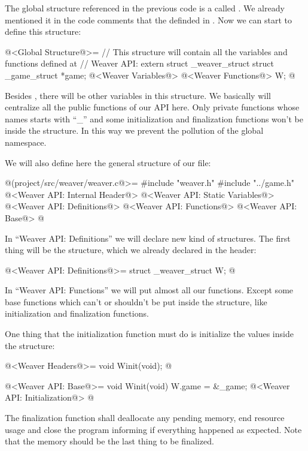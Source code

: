 The global structure referenced in the previous code is a
 called . We already mentioned it
in the code comments that the
 definded in
. Now we can start to define this structure:

\iniciocodigo
@<Global Structure@>=
// This structure will contain all the variables and functions defined at
// Weaver API:
extern struct _weaver_struct{
  struct _game_struct *game;
  @<Weaver Variables@>
  @<Weaver Functions@>
} W;
@
\fimcodigo

Besides , there will be other variables in this
structure. We basically will centralize all the public functions of
our API here. Only private functions whose names starts with ``\_''
and some initialization and finalization functions won't be inside
the  structure. In this way we prevent the pollution of
the global namespace.

We will also define here the general structure of
our  file:

\iniciocodigo
@(project/src/weaver/weaver.c@>=
#include "weaver.h"
#include "../game.h"
@<Weaver API: Internal Header@>
@<Weaver API: Static Variables@>
@<Weaver API: Definitions@>
@<Weaver API: Functions@>
@<Weaver API: Base@>
@
\fimcodigo

In ``Weaver API: Definitions'' we will declare new kind of structures.
The first thing will be the  structure, which we already
declared in the header:

\iniciocodigo
@<Weaver API: Definitions@>=
struct _weaver_struct W;
@
\fimcodigo

In ``Weaver API: Functions'' we will put almost all our
functions. Except some base functions which can't or shouldn't be put
inside the  structure, like initialization and
finalization functions.


One thing that the initialization function must do is initialize the
values inside the   structure:

\iniciocodigo
@<Weaver Headers@>=
void Winit(void);
@
\fimcodigo

\iniciocodigo
@<Weaver API: Base@>=
void Winit(void){
  W.game = &_game;
  @<Weaver API: Initialization@>
}
@
\fimcodigo

The finalization function shall deallocate any pending memory, end
resource usage and close the program informing if everything happened
as expected. Note that the memory should be the last thing to be
finalized.

